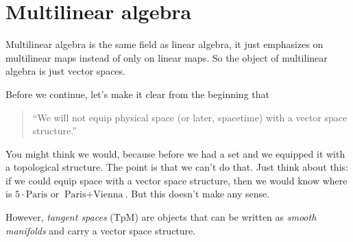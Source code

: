 %

\chapter{Multilinear algebra}
Multilinear algebra is the same field as linear algebra, it just emphasizes on multilinear maps
instead of only on linear maps. So the object of multilinear algebra is just vector spaces.

Before we continue, let's make it clear from the beginning that
\begin{quotation}
  ``We will not equip physical space (or later, spacetime) with a vector space structure.''
\end{quotation}

You might think we would, because before we had a set and we equipped it with a topological
structure. The point is that we can't do that. Just think about this: if we could equip space with
a vector space structure, then we would know where is $5\cdot \text{Paris}$ or
$\text{Paris} + \text{Vienna}$. But this doesn't make any sense.

However, \emph{tangent spaces}\footnotemark{} ($\text{TpM}$) are objects that can be written as
\emph{smooth manifolds}\footnotemark{} and carry a vector space structure.

